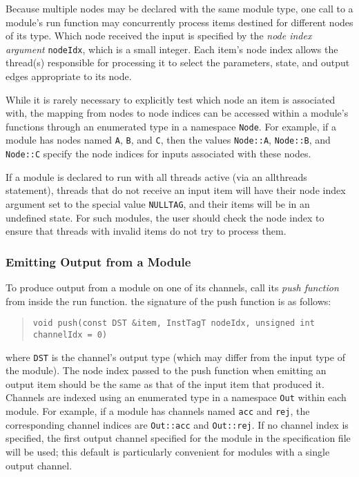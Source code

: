\documentclass[11pt]{article}
\begin{document}
Because multiple nodes may be declared with the same module type, one
call to a module's run function may concurrently process items
destined for different nodes of its type.  Which node received the
input is specified by the \textit{node index argument}
\texttt{nodeIdx}, which is a small integer.  Each item's node index
allows the thread(s) responsible for processing it to select the
parameters, state, and output edges appropriate to its node.

While it is rarely necessary to explicitly test which node an item is
associated with, the mapping from nodes to node indices can be
accessed within a module's functions through an enumerated type in a
namespace \texttt{Node}.  For example, if a module has nodes named
\texttt{A}, \texttt{B}, and \texttt{C}, then the values
\texttt{Node::A}, \texttt{Node::B}, and \texttt{Node::C} specify the
node indices for inputs associated with these nodes.

If a module is declared to run with all threads active (via an
allthreads statement), threads that do not receive an input item will
have their node index argument set to the special value
\texttt{NULLTAG}, and their items will be in an undefined state.  For
such modules, the user should check the node index to ensure that
threads with invalid items do not try to process them.


\subsubsection{Emitting Output from a Module}

To produce output from a module on one of its channels, call its
\textit{push function} from inside the run function.  the signature
of the push function is as follows:
\begin{quote}
\texttt{void push(const DST \&item, InstTagT nodeIdx, unsigned int channelIdx = 0)}
\end{quote}
where \texttt{DST} is the channel's output type (which may differ from
the input type of the module).  The node index passed to the push function
when emitting an output item should be the same as that of the input
item that produced it.  Channels are indexed using an enumerated type
in a namespace \texttt{Out} within each module.  For example, if a
module has channels named \texttt{acc} and \texttt{rej}, the
corresponding channel indices are \texttt{Out::acc} and
\texttt{Out::rej}.  If no channel index is specified, the first
output channel specified for the module in the specification file
will be used; this default is particularly convenient for modules
with a single output channel.
\end{document}
